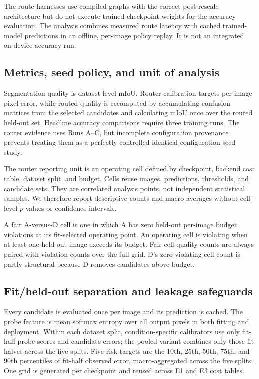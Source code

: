 \documentclass[a4paper,review,12pt]{elsarticle}
\newcommand{\miou}{mIoU}
\begin{document}
The route harnesses use compiled graphs with the correct post-rescale architecture but do not execute trained checkpoint weights for the accuracy evaluation. The analysis combines measured route latency with cached trained-model predictions in an offline, per-image policy replay. It is not an integrated on-device accuracy run.

\subsection{Metrics, seed policy, and unit of analysis}

Segmentation quality is dataset-level \miou{}. Router calibration targets per-image pixel error, while routed quality is recomputed by accumulating confusion matrices from the selected candidates and calculating \miou{} once over the routed held-out set. Headline accuracy comparisons require three training runs. The router evidence uses Runs A--C, but incomplete configuration provenance prevents treating them as a perfectly controlled identical-configuration seed study.

The router reporting unit is an operating cell defined by checkpoint, backend cost table, dataset split, and budget. Cells reuse images, predictions, thresholds, and candidate sets. They are correlated analysis points, not independent statistical samples. We therefore report descriptive counts and macro averages without cell-level $p$-values or confidence intervals.

A fair A-versus-D cell is one in which A has zero held-out per-image budget violations at its fit-selected operating point. An operating cell is violating when at least one held-out image exceeds its budget. Fair-cell quality counts are always paired with violation counts over the full grid. D's zero violating-cell count is partly structural because D removes candidates above budget.

\subsection{Fit/held-out separation and leakage safeguards}
\label{sec:split}

Every candidate is evaluated once per image and its prediction is cached. The probe feature is mean softmax entropy over all output pixels in both fitting and deployment. Within each dataset split, condition-specific calibrators use only fit-half probe scores and candidate errors; the pooled variant combines only those fit halves across the five splits. Five risk targets are the 10th, 25th, 50th, 75th, and 90th percentiles of fit-half observed error, macro-aggregated across the five splits. One grid is generated per checkpoint and reused across E1 and E3 cost tables.
\end{document}
